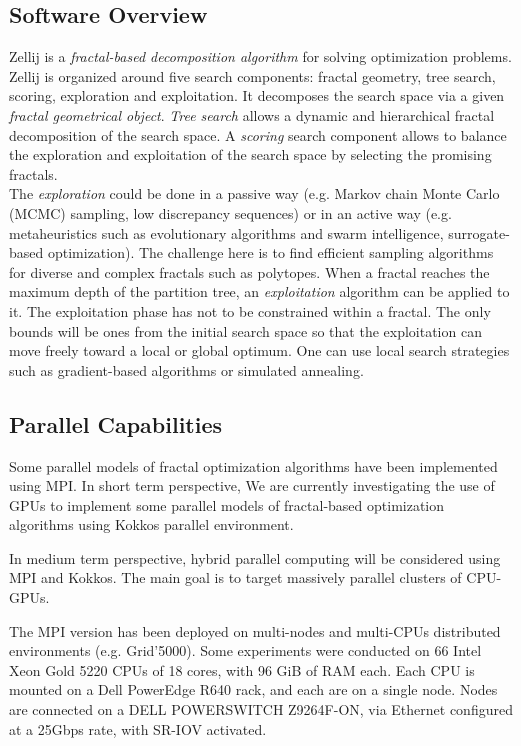 \subsection{Software Overview}
\label{sec:WP5:Zellij:summary}

Zellij is a {\it fractal-based decomposition algorithm} for solving optimization problems. Zellij is organized around five search components: fractal geometry, tree search, scoring, exploration and exploitation. It decomposes the search space via a given \textit{fractal geometrical object}. {\it Tree search} allows a dynamic and hierarchical fractal decomposition of the search space. A \textit{scoring} search component allows to balance the exploration and exploitation of the search space by selecting the promising fractals. \\

The {\it exploration} could be done in a passive way (e.g. Markov chain Monte Carlo (MCMC) sampling, low discrepancy sequences) or in an active way (e.g. metaheuristics such as evolutionary algorithms and swarm intelligence, surrogate-based optimization). The challenge here is to find efficient sampling algorithms for diverse and complex fractals such as polytopes. When a fractal reaches the maximum depth of the partition tree, an {\it exploitation} algorithm can be applied to it. The exploitation phase has not to be constrained within a fractal. The only bounds will be ones from the initial search space so that the exploitation can move freely toward a local or global optimum. One can use local search strategies such as gradient-based algorithms or simulated annealing.

\subsection{Parallel Capabilities}
\label{sec:WP5:Zellij:performances}

Some parallel models of fractal optimization algorithms have been implemented using MPI. In short term perspective, We are currently investigating the use of GPUs to implement some parallel models of fractal-based optimization algorithms using Kokkos parallel environment.

In medium term perspective, hybrid parallel computing will be considered using MPI and Kokkos. The main goal is to target massively parallel clusters of CPU-GPUs.
    
The MPI version has been deployed on multi-nodes and multi-CPUs distributed environments (e.g. Grid'5000). Some experiments were conducted on 66 Intel Xeon Gold 5220 CPUs of 18 cores, with 96 GiB of RAM each. Each CPU is mounted on a Dell PowerEdge R640 rack, and each are on a single node. Nodes are connected on a DELL POWERSWITCH Z9264F-ON, via Ethernet configured at a 25Gbps rate, with SR-IOV activated. \\

